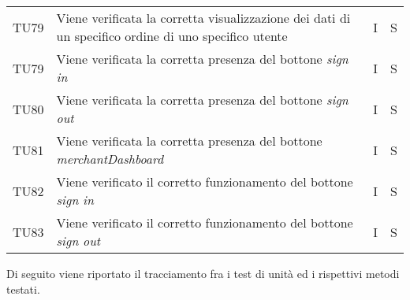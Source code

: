 {\begin{longtable}{C{2cm} C{9.6cm} C{1.5cm} C{1cm}}
TU79 & Viene verificata la corretta visualizzazione dei dati di un specifico ordine di uno specifico utente  & I & S\\ 

TU79 & Viene verificata la corretta presenza del bottone \textit{sign in}& I & S\\

TU80 & Viene verificata la corretta presenza del bottone \textit{sign out} & I & S\\

TU81 & Viene verificata la corretta presenza del bottone \textit{merchantDashboard} & I & S\\

TU82 & Viene verificato il corretto funzionamento del bottone \textit{sign in} & I & S\\

TU83 & Viene verificato il corretto funzionamento del bottone \textit{sign out} & I & S\\


\end{longtable}

}

Di seguito viene riportato il tracciamento fra i test di unità ed i rispettivi metodi testati.

